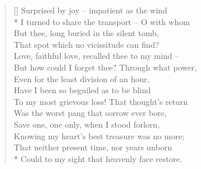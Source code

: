 \documentclass[MAIN]{subfiles}
\begin{document}
\settowidth{\versewidth}{Surprised by joy -- impatient as the wind}
\begin{verse}[\versewidth]
Surprised by joy -- impatient as the wind\\*
\vin I turned to share the transport -- O with whom\\
\vin But thee, long buried in the silent tomb,\\
That spot which no vicissitude can find?\\
Love, faithful love, recalled thee to my mind --\\
\vin But how could I forget thee? Through what power,\\
\vin Even for the least division of an hour,\\
Have I been so beguiled as to be blind\\
To my most grievous loss! That thought's return\\
\vin Was the worst pang that sorrow ever bore,\\
Save one, one only, when I stood forlorn,\\
\vin Knowing my heart's best treasure was no more;\\
That neither present time, nor years unborn\\*
\vin Could to my sight that heavenly face restore.
\end{verse}
\end{document}
